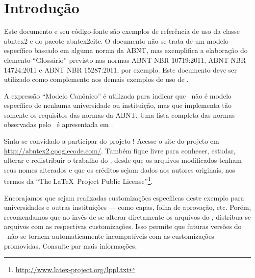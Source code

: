 \documentclass[
	12pt,				%
	openright,			%
	twoside,			%
	a4paper,			%
	english,			%
	french,				%
	spanish,			%
	brazil,				%
	]{abntex2}
\begin{document}
 
\frenchspacing
 
 
\imprimircapa
 
\tableofcontents*
\cleardoublepage
  
 
\textual
 
\chapter*[Introdução]{Introdução}
 
Este documento e seu código-fonte são exemplos de referência de uso da classe
\textsf{abntex2} e do pacote \textsf{abntex2cite}. O documento não se trata de
um modelo específico baseado em alguma norma da ABNT, mas exemplifica a
elaboração do elemento ``Glossário'' previsto nas normas ABNT NBR
10719:2011, ABNT NBR 14724:2011 e ABNT NBR 15287:2011, por exemplo. Este
documento deve ser utilizado como complemento aos demais exemplos de uso de
\abnTeX.

A expressão ``Modelo Canônico'' é utilizada para indicar que \abnTeX\ não é
modelo específico de nenhuma universidade ou instituição, mas que implementa tão
somente os requisitos das normas da ABNT. Uma lista completa das normas
observadas pelo \abnTeX\ é apresentada em .
 
Sinta-se convidado a participar do projeto \abnTeX! Acesse o site do projeto em
\url{http://abntex2.googlecode.com/}. Também fique livre para conhecer,
estudar, alterar e redistribuir o trabalho do \abnTeX, desde que os arquivos
modificados tenham seus nomes alterados e que os créditos sejam dados aos
autores originais, nos termos da ``The \LaTeX\ Project Public
License''\footnote{\url{http://www.latex-project.org/lppl.txt}}.
 
Encorajamos que sejam realizadas customizações específicas deste exemplo para
universidades e outras instituições --- como capas, folha de aprovação, etc.
Porém, recomendamos que ao invés de se alterar diretamente os arquivos do
\abnTeX, distribua-se arquivos com as respectivas customizações.
Isso permite que futuras versões do \abnTeX~não se tornem automaticamente
incompatíveis com as customizações promovidas. Consulte
 par mais informações.
 
\end{document}
